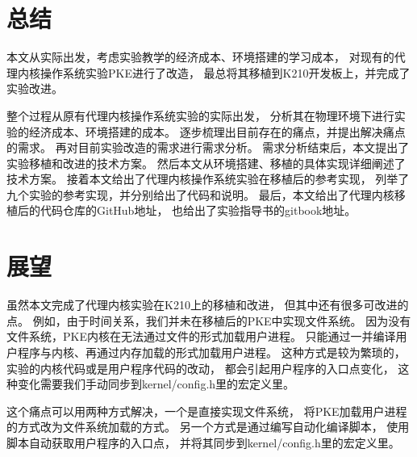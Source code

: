 %
%
%
%
%
%

\renewcommand{\thechapter}{结论}




\section{总结}

本文从实际出发，考虑实验教学的经济成本、环境搭建的学习成本，
对现有的代理内核操作系统实验PKE进行了改造，
最总将其移植到K210开发板上，并完成了实验改进。

整个过程从原有代理内核操作系统实验的实际出发，
分析其在物理环境下进行实验的经济成本、环境搭建的成本。
逐步梳理出目前存在的痛点，并提出解决痛点的需求。
再对目前实验改造的需求进行需求分析。
需求分析结束后，本文提出了实验移植和改进的技术方案。
然后本文从环境搭建、移植的具体实现详细阐述了技术方案。
接着本文给出了代理内核操作系统实验在移植后的参考实现，
列举了九个实验的参考实现，并分别给出了代码和说明。
最后，本文给出了代理内核移植后的代码仓库的GitHub地址，
也给出了实验指导书的gitbook地址。

\section{展望}

虽然本文完成了代理内核实验在K210上的移植和改进，
但其中还有很多可改进的点。
例如，由于时间关系，我们并未在移植后的PKE中实现文件系统。
因为没有文件系统，PKE内核在无法通过文件的形式加载用户进程。
只能通过一并编译用户程序与内核、再通过内存加载的形式加载用户进程。
这种方式是较为繁琐的，实验的内核代码或是用户程序代码的改动，
都会引起用户程序的入口点变化，
这种变化需要我们手动同步到kernel/config.h里的宏定义里。

这个痛点可以用两种方式解决，一个是直接实现文件系统，
将PKE加载用户进程的方式改为文件系统加载的方式。
另一个方式是通过编写自动化编译脚本，
使用脚本自动获取用户程序的入口点，
并将其同步到kernel/config.h里的宏定义里。
